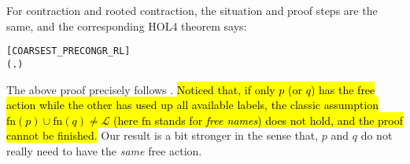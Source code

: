 For contraction and rooted contraction, the situation and proof
steps are the same, and the corresponding HOL4 theorem says:
\vspace{-2ex}
\begin{alltt}
\hfill{[COARSEST_PRECONGR_RL]}
\HOLTokenTurnstile{}   \HOLSymConst{\HOLTokenConj{}}   \HOLSymConst{\HOLTokenImp{}} (\HOLSymConst{\HOLTokenForall{}}.  \HOLSymConst{+}  \HOLSymConst{\HOLTokenContracts{}}  \HOLSymConst{+} ) \HOLSymConst{\HOLTokenImp{}}  \HOLSymConst{\HOLTokenObsContracts} 
\end{alltt}

The above proof precisely follows \cite{Mil89}. \hl{Noticed that,
if only $p$ (or $q$) has the free action while the other has used up all available
labels, the classic assumption $\mathrm{fn}(p) \cup
\mathrm{fn}(q) \neq \mathscr{L}$ (here $\mathrm{fn}$ stands for \emph{free
  names}) does not hold, and the proof cannot be finished.} Our result is a bit stronger in the
sense that, $p$ and $q$ do not really need to have the \emph{same} free action.

